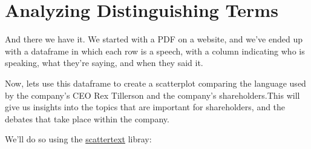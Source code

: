 \documentclass[
  letterpaper,
  DIV=11,
  numbers=noendperiod]{scrreprt}
\begin{document}
\hypertarget{analyzing-distinguishing-terms}{%
\section{Analyzing Distinguishing
Terms}\label{analyzing-distinguishing-terms}}

And there we have it. We started with a PDF on a website, and we've
ended up with a dataframe in which each row is a speech, with a column
indicating who is speaking, what they're saying, and when they said it.

Now, lets use this dataframe to create a scatterplot comparing the
language used by the company's CEO Rex Tillerson and the company's
shareholders.This will give us insights into the topics that are
important for shareholders, and the debates that take place within the
company.

We'll do so using the
\href{https://spacy.io/universe/project/scattertext}{scattertext}
libray:
\end{document}
